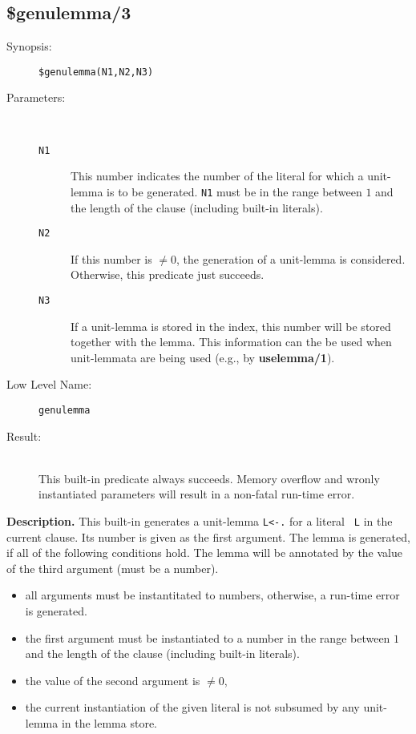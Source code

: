 %
%
%
\subsection{\$genulemma/3}

\begin{description}
\item[Synopsis:]
	{\tt \$genulemma(N1,N2,N3)}
\item[Parameters:]\ \\[-0.5cm]
	\begin{description}
	\item[{\tt N1}]
        This number indicates the number of the literal for which
        a unit-lemma is to be generated. {\tt N1} must be in the
        range between $1$ and the length of the clause (including
        built-in literals).
        \item[{\tt N2}]
        If this number is $\neq 0$, the generation of a unit-lemma
        is considered. Otherwise, this predicate just succeeds.
        \item[{\tt N3}]
        If a unit-lemma is stored in the index, this number will be
        stored together with the lemma. This information can the
        be used when unit-lemmata are being used (e.g., by {\bf uselemma/1}).
        \end{description}
\item[Low Level Name:]
	{\tt genulemma}
\item[Result:]\ \\
        This built-in predicate always succeeds. Memory overflow and
        wronly instantiated parameters will result in a
        non-fatal run-time error.
\end{description}

\vspace*{0.5cm}
\noindent
{\bf Description.}
This built-in generates a unit-lemma {\tt L<-.} for a literal
{\tt ~L} in the current clause. Its number is given as the first argument.
The lemma is generated, if all of the following
conditions hold.
The lemma will be annotated by the value of the third argument
(must be a number).
 
\begin{itemize}
\item
all arguments must be instantitated to numbers,
otherwise, a run-time error is generated.
\item
the first argument must be instantiated to a number
in the range between $1$ and the length of the clause (including
built-in literals).
\item
the value of the second argument is $\neq 0$,
\item
the current instantiation of the given literal is not subsumed
by any unit-lemma in the lemma store.
\end{itemize}

